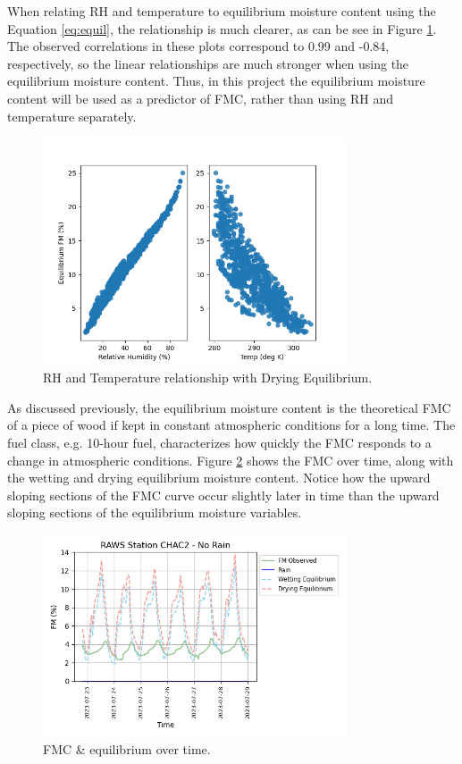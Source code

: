 \documentclass[11pt]{article}%
\begin{document}
When relating RH and temperature to equilibrium moisture content using the Equation \ref{eq:equil}, the relationship is much clearer, as can be see in Figure \ref{fig:eq_rh_temp_plot}. The observed correlations in these plots correspond to 0.99 and -0.84, respectively, so the linear relationships are much stronger when using the equilibrium moisture content. Thus, in this project the equilibrium moisture content will be used as a predictor of FMC, rather than using RH and temperature separately.

\begin{figure}[ht]
    \centering
    \includegraphics[width=0.8\textwidth]{images/eq_rh_temp_plot.png}
    \caption{RH and Temperature relationship with Drying Equilibrium.}
    \label{fig:eq_rh_temp_plot}
\end{figure}

As discussed previously, the equilibrium moisture content is the theoretical FMC of a piece of wood if kept in constant atmospheric conditions for a long time. The fuel class, e.g. 10-hour fuel, characterizes how quickly the FMC responds to a change in atmospheric conditions. Figure \ref{fig:eq_plot} shows the FMC over time, along with the wetting and drying equilibrium moisture content. Notice how the upward sloping sections of the FMC curve occur slightly later in time than the upward sloping sections of the equilibrium moisture variables. 

\begin{figure}[ht]
    \centering
    \includegraphics[width=0.8\textwidth]{images/eq_plot.png}
    \caption{FMC \& equilibrium over time.}
    \label{fig:eq_plot}
\end{figure}
\end{document}
